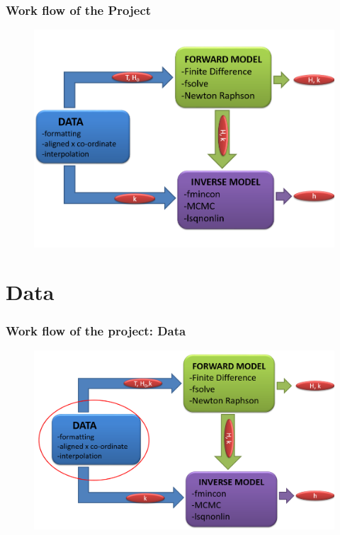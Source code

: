\documentclass[7pt]{beamer}
\begin{document}

\begin{frame}
 \frametitle{Work flow of the Project}




\begin{figure}[H]
	 	\centering
	 	\includegraphics[width=1.0\linewidth]{img/Flow_C.png}
	 	\end{figure}

\end{frame}






\section{Data}
\begin{frame}
\frametitle{Work flow of the project: Data }
\begin{figure}[flowchart]
\includegraphics[width=1.0\linewidth]{img/Focus_D.png}\hfill
\end{figure}

\end{frame}
\end{document}
